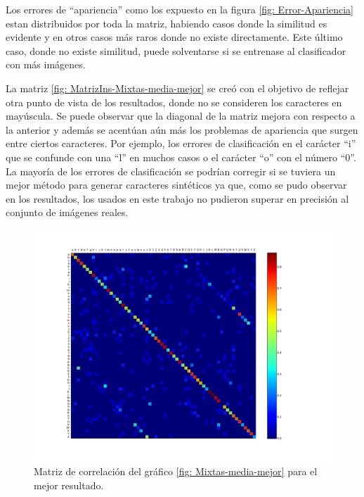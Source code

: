 	Los errores de ``apariencia'' como los expuesto en la figura \ref{fig: Error-Apariencia} estan distribuidos por toda la matriz, habiendo casos donde la similitud es evidente y en otros casos más raros donde no existe directamente. Este último caso, donde no existe similitud, puede solventarse si se entrenase al clasificador con más imágenes.

	La matriz \ref{fig: MatrizIns-Mixtas-media-mejor} se creó con el objetivo de reflejar otra punto de vista de los resultados, donde no se consideren los caracteres en mayúscula. Se puede observar que la diagonal de la matriz mejora con respecto a la anterior y además se acentúan aún más los problemas de apariencia que surgen entre ciertos caracteres. Por ejemplo, los errores de clasificación en el carácter ``i'' que se confunde con una ``l'' en muchos casos o el carácter ``o'' con el número ``0''. La mayoría de los errores de clasificación se podrían corregir si se tuviera un mejor método para generar caracteres sintéticos ya que, como se pudo observar en los resultados, los usados en este trabajo no pudieron superar en precisión al conjunto de imágenes reales.



			\begin{figure}[!htbp]
				\centerline{\includegraphics[scale=0.4]{img/resultados/mixtas/best_mean_matrix_Alpha0,01_2040-4.png}}
				\caption[Mixtas Matriz expon]{Matriz de correlación del gráfico \ref{fig: Mixtas-media-mejor} para el mejor resultado. }
				\label{fig: Mixtas-Matrix-media-mejor}
			\end{figure}

